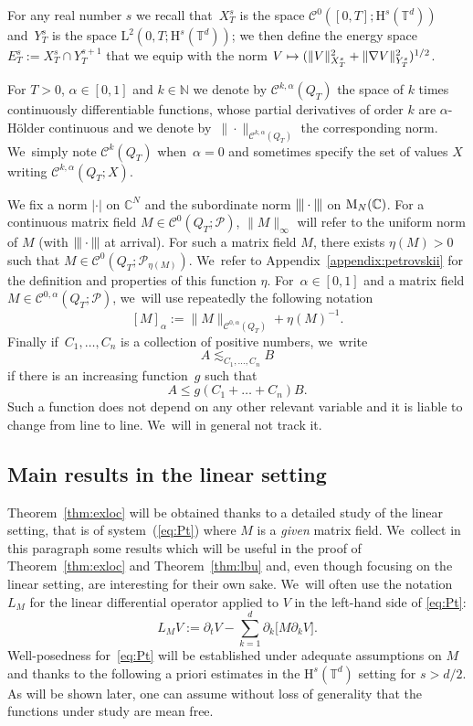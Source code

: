 \documentclass[10pt]{amsart}
\newcommand\mto{\mathchoice{\longmapsto}{\mapsto}{\mapsto}{\mapsto}}
\theoremstyle{definition}
\newcommand\N{\mathbb{N}}
\newcommand\T{\mathbb{T}}
\renewcommand\H{\mathrm{H}}
\renewcommand\L{\mathrm{L}}
\newcommand{\vertiii}[1]{{\vert\kern-0.08em\vert\kern-0.08em\vert #1 \vert\kern-0.08em\vert\kern-0.08em\vert}}
\begin{document}
For any real number $s$ we recall that~$X_T^s$ is the space $\mathscr{C}^0([0,T];\H^s(\T^d))$ and~$Y_T^s$ is the space $\L^2(0,T;\H^{s}(\T^d))$; we then define the energy space $E_T^s:=X_T^s \cap Y_T^{s+1}$ that we equip with the norm $V\mto (\|V\|_{X_T^s}^2 + \|\nabla V\|_{Y_T^s}^2)^{1/2}$.

For $T>0$, $\alpha\in[0,1]$ and $k\in\N$ we denote by $\mathscr{C}^{k,\alpha}(Q_T)$ the space of $k$ times continuously differentiable functions, whose partial derivatives of order $k$ are $\alpha$-Hölder continuous and we denote by~$\|{\cdot}\|_{\mathscr{C}^{k,\alpha}(Q_T)}$ the corresponding norm. We~simply note $\mathscr{C}^k(Q_T)$ when~$\alpha=0$ and sometimes specify the set of values $X$ writing $\mathscr{C}^{k,\alpha}(Q_T;X)$.

We fix a norm $|{{\cdot}}|$ on $\mathbb{C}^N$ and the subordinate norm $\vertiii{\cdot}$ on $\textnormal{M}_N(\mathbb{C})$. For a continuous matrix field $M\in\mathscr{C}^0(Q_T;\mathscr{P})$, $\|M\|_\infty$ will refer to the uniform norm of $M$ (with $\vertiii{\cdot}$ at arrival). For such a matrix field $M$, there exists $\eta(M)>0$ such that $M\in\mathscr{C}^0(Q_T;\mathscr{P}_{\eta(M)})$. We~refer to Appendix~\ref{appendix:petrovskii} for the definition and properties of this function $\eta$.
For~$\alpha\in[0,1]$ and a matrix field $M\in\mathscr{C}^{0,\alpha}(Q_T;\mathscr{P})$, we~will use repeatedly the following notation
\begin{equation}\label{defnormalpha}
[M]_{\alpha}:= \|M\|_{\mathscr{C}^{0,\alpha}(Q_T)}+\eta(M)^{-1}.
\end{equation}
Finally if~$C_1,\dots,C_n$ is a collection of positive numbers, we~write
\[
A \lesssim_{C_1,\dots,C_n} B
\]
if there is an increasing function~$g$ such that
\[
A \leq g(C_1+\dots+C_n) B.
\]
Such a function does not depend on any other relevant variable and it is liable to change from line to line. We~will in general not track it.
\subsection{Main results in the linear setting}
Theorem~\ref{thm:exloc} will be obtained thanks to a detailed study of the linear setting, that is of system~(\ref{eq:Pt}) where $M$ is a \emph{given} matrix field. We~collect in this paragraph some results which will be useful in the proof of Theorem~\ref{thm:exloc} and Theorem~\ref{thm:lbu} and, even though focusing on the linear setting, are interesting for their own sake. We~will often use the notation $L_M$ for the linear differential operator applied to $V$ in the left-hand side of \eqref{eq:Pt}:
\[
L_M V:= \partial_t V - \sum_{k=1}^d \partial_k\bigl[M\partial_k V \bigr].
\]
Well-posedness for~\eqref{eq:Pt} will be established under adequate assumptions on $M$ and thanks to the following a priori estimates in the $\H^s(\T^d)$ setting for $s>d/2$. As will be shown later, one can assume without loss of generality that the functions under study are mean free.
\end{document}
